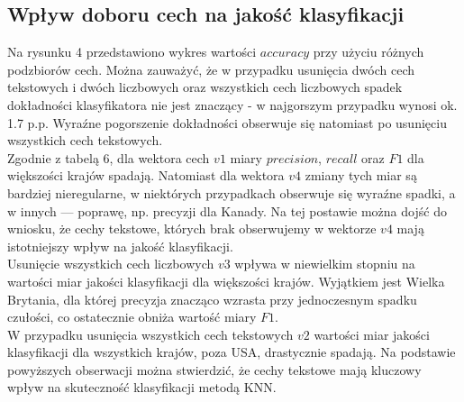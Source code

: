 \documentclass{article}
\begin{document}
\subsection{Wpływ doboru cech na jakość klasyfikacji}
Na rysunku 4 przedstawiono wykres wartości \(accuracy\) przy użyciu różnych podzbiorów cech. Można zauważyć, że w przypadku usunięcia dwóch cech tekstowych i dwóch liczbowych oraz  wszystkich cech liczbowych spadek dokładności klasyfikatora nie jest znaczący - w najgorszym przypadku wynosi ok. 1.7 p.p. Wyraźne pogorszenie dokładności obserwuje się natomiast po usunięciu wszystkich cech tekstowych. \\
Zgodnie z tabelą 6, dla wektora cech \(v1\) miary \(precision\), \(recall\) oraz \(F1\) dla większości krajów spadają. Natomiast dla wektora \(v4\) zmiany tych miar są bardziej nieregularne, w niektórych przypadkach obserwuje się wyraźne spadki, a w innych — poprawę, np. precyzji dla Kanady. Na tej postawie można dojść do wniosku, że cechy tekstowe, których brak obserwujemy w wektorze \(v4\) mają istotniejszy wpływ na jakość klasyfikacji. \\
Usunięcie wszystkich cech liczbowych \(v3\) wpływa w niewielkim stopniu na wartości miar jakości klasyfikacji dla większości krajów. Wyjątkiem jest Wielka Brytania, dla której precyzja znacząco wzrasta przy jednoczesnym spadku czułości, co ostatecznie obniża wartość miary \(F1\). \\
W przypadku usunięcia wszystkich cech tekstowych \(v2\) wartości miar jakości klasyfikacji dla wszystkich krajów, poza USA, drastycznie spadają. Na podstawie powyższych obserwacji można stwierdzić, że cechy tekstowe mają kluczowy wpływ na skuteczność klasyfikacji metodą KNN.
\end{document}
